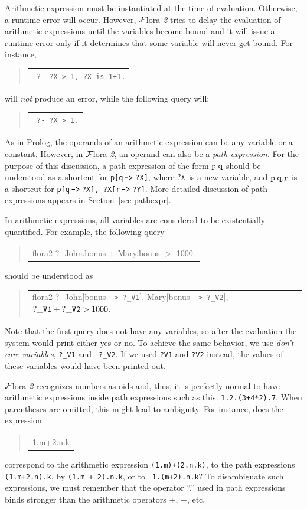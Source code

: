 \documentclass[11pt]{article}
\newenvironment{qrules}{\begin{quote}\tt\begin{tabular}[t]{l}}%
{\end{tabular}\end{quote}}
\newcommand{\mvd}{{\mbox{\tt \,->\,}}}  %
\newcommand{\FLORA}{{\mbox{\sc ${\cal F}${lora}\rm\emph{-2}}}\xspace}
\begin{document}
Arithmetic expression must be instantiated at the time of
evaluation. Otherwise, a runtime error will occur.
However, \FLORA tries to delay the evaluation of arithmetic expressions
until the variables become bound and it will issue a runtime error only if
it determines that some variable will never get bound.
For instance,
\begin{qrules}
  \tt
?- ?X > 1, ?X is 1+1.
\end{qrules}
will \emph{not}  produce an error, while the following query will:
\begin{qrules}
  \tt
?-  ?X > 1.
\end{qrules}

As in Prolog, the operands of an arithmetic expression can be any variable
or a constant. However, in \FLORA, an operand can also be a \emph{path
  expression}. For the purpose of this discussion, a path expression of the
form $\tt p.q$ should be understood as a shortcut for {\tt p[q$\mvd$?X]}, where
$\tt ?X$ is a new variable, and $\tt p.q.r$ is a shortcut for {\tt p[q$\mvd$?X],
  ?X[r$\mvd$?Y]}. More detailed discussion
of path expressions appears in Section~\ref{sec-pathexpr}.

In arithmetic expressions, all variables are considered to be
existentially quantified. For example, the following query
\begin{qrules}
flora2 ?- John.bonus $+$ Mary.bonus $>$ 1000.
\end{qrules}
should be understood as
\begin{qrules}
flora2 ?- John[bonus{\mvd}{\tt ?\_V1}], Mary[bonus{\mvd}{\tt ?\_V2}], ${\tt ?\_V1}+{\tt ?\_V2} > 1000$.
\end{qrules}
Note that the first query does not have any variables, so after the
evaluation the system would print either yes or no. To achieve the same
behavior, we use \emph{don't care variables}, {\tt ?\_V1} and {\tt
  ?\_V2}. If we used {\tt ?V1} and {\tt ?V2} instead, the values of these
variables would have been printed out.

\FLORA recognizes numbers as oids and, thus, it is perfectly normal to have
arithmetic expressions inside path expressions such as this:
{\tt 1.2.(3+4*2).7}. When parentheses are omitted, this might lead to
ambiguity.
For instance, does the expression
\begin{qrules}
1.m+2.n.k
\end{qrules}
correspond to
the arithmetic expression {\tt (1.m)+(2.n.k)}, to
the path expressions {\tt (1.m+2.n).k}, by {\tt (1.m + 2).n.k}, or to {\tt
  1.(m+2).n.k}? To disambiguate such expressions, we must remember that the
operator ``.'' used in path expressions binds stronger than the
arithmetic operators $+$, $-$, etc.
\end{document}
